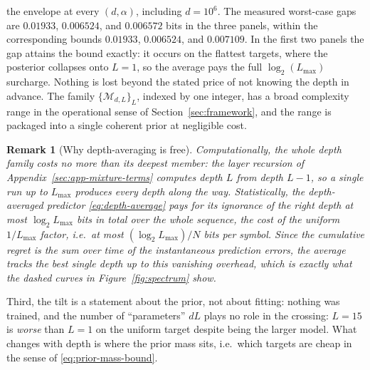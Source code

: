 \documentclass[11pt]{article}
\newcommand{\Nseq}{N}
\newcommand{\model}{\mathcal{M}_{d,L}}
\newtheorem{remark}{Remark}
\begin{document}
the envelope at every \((d,\alpha)\), including \(d=10^6\).
The measured worst-case gaps are $0.01933$, $0.006524$, and $0.006572$ bits
in the three panels, within the corresponding bounds $0.01933$, $0.006524$,
and $0.007109$.  In the first two panels the gap attains the bound exactly:
it occurs on the flattest targets, where the posterior collapses onto
$L=1$, so the average pays the full $\log_2(L_{\max})$ surcharge.  Nothing
is lost beyond the stated price of not knowing the depth in advance.
The family \(\{\model\}_L\), indexed by one integer, has a broad complexity
range in the operational sense of Section~\ref{sec:framework}, and the
range is packaged into a single coherent prior at negligible cost.
\begin{remark}[Why depth-averaging is free]
\label{rem:double-mix}
Computationally, the whole depth family costs no more than its deepest
member: the layer recursion of Appendix~\ref{sec:app-mixture-terms}
computes depth \(L\) from depth \(L-1\), so a single run up to
\(L_{\max}\) produces every depth along the way.  Statistically, the
depth-averaged predictor \eqref{eq:depth-average} pays for its ignorance
of the right depth at most \(\log_2 L_{\max}\) bits \emph{in total} over
the whole sequence, the cost of the uniform \(1/L_{\max}\) factor, i.e.\
at most \((\log_2 L_{\max})/\Nseq\) bits per symbol.  Since the cumulative
regret is the sum over time of the instantaneous prediction errors, the
average tracks the best single depth up to this vanishing overhead, which
is exactly what the dashed curves in Figure~\ref{fig:spectrum} show. 
\end{remark}
Third, the tilt is a statement about the prior, not about fitting: nothing
was trained, and the number of ``parameters'' \(dL\) plays no role in the
crossing: \(L=15\) is \emph{worse} than \(L=1\) on the uniform target despite
being the larger model.  What changes with depth is where the prior
mass sits, i.e.\ which targets are cheap in the sense of
\eqref{eq:prior-mass-bound}.
\end{document}
